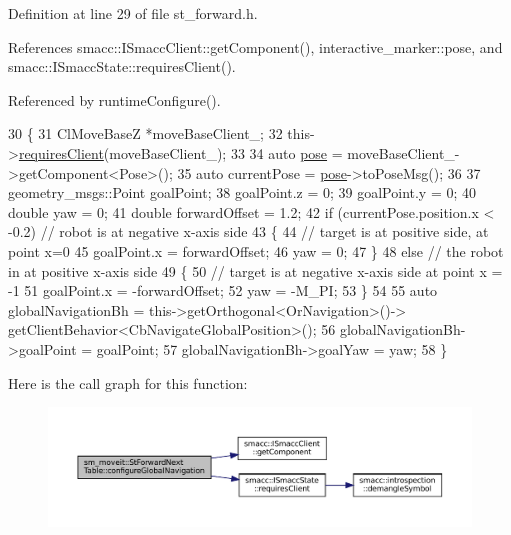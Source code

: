 Definition at line 29 of file st\+\_\+forward.\+h.



References smacc\+::\+I\+Smacc\+Client\+::get\+Component(), interactive\+\_\+marker\+::pose, and smacc\+::\+I\+Smacc\+State\+::requires\+Client().



Referenced by runtime\+Configure().


\begin{DoxyCode}
30   \{
31     ClMoveBaseZ *moveBaseClient\_;
32     this->\hyperlink{classsmacc_1_1ISmaccState_a7f95c9f0a6ea2d6f18d1aec0519de4ac}{requiresClient}(moveBaseClient\_);
33 
34     \textcolor{keyword}{auto} \hyperlink{namespaceinteractive__marker_a06e4691dc5f93e0da6dc9a6efa8d99b5}{pose} = moveBaseClient\_->getComponent<Pose>();
35     \textcolor{keyword}{auto} currentPose = \hyperlink{namespaceinteractive__marker_a06e4691dc5f93e0da6dc9a6efa8d99b5}{pose}->toPoseMsg();
36 
37     geometry\_msgs::Point goalPoint;
38     goalPoint.z = 0;
39     goalPoint.y = 0;
40     \textcolor{keywordtype}{double} yaw = 0;
41     \textcolor{keywordtype}{double} forwardOffset = 1.2;
42     \textcolor{keywordflow}{if} (currentPose.position.x < -0.2)  \textcolor{comment}{// robot is at negative x-axis side}
43     \{
44       \textcolor{comment}{// target is at positive side, at point x=0}
45       goalPoint.x = forwardOffset;
46       yaw = 0;
47     \}
48     \textcolor{keywordflow}{else}  \textcolor{comment}{// the robot in at positive x-axis side}
49     \{
50       \textcolor{comment}{// target is at negative x-axis side at point x = -1}
51       goalPoint.x = -forwardOffset;
52       yaw = -M\_PI;
53     \}
54 
55     \textcolor{keyword}{auto} globalNavigationBh = this->getOrthogonal<OrNavigation>()->
      getClientBehavior<CbNavigateGlobalPosition>();
56     globalNavigationBh->goalPoint = goalPoint;
57     globalNavigationBh->goalYaw = yaw;
58   \}
\end{DoxyCode}
Here is the call graph for this function\+:
\nopagebreak
\begin{figure}[H]
\begin{center}
\leavevmode
\includegraphics[width=350pt]{structsm__moveit_1_1StForwardNextTable_ac3b63f25fad5cecd8faa51b427719d07_cgraph}
\end{center}
\end{figure}
